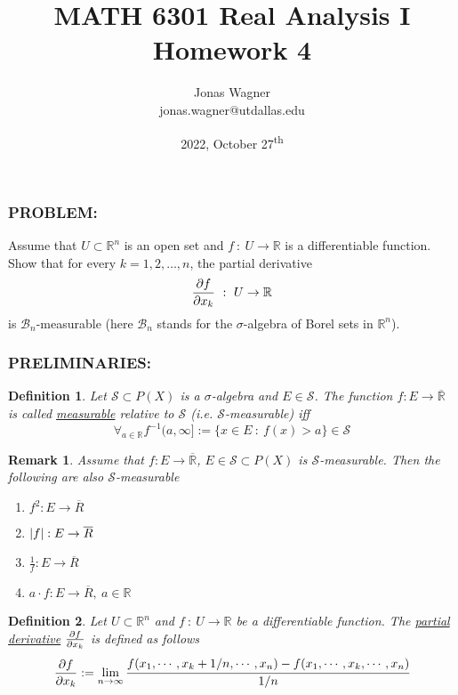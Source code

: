 \documentclass[]{article}
\title{MATH 6301 Real Analysis I \\ Homework 4}
\author{Jonas Wagner\\ jonas.wagner@utdallas.edu}
\date{2022, October 27\textsuperscript{th}}
\newcommand{\Problem}{\subsubsection*{\textbf{PROBLEM:}}}
\newcommand{\Preliminaries}{\subsubsection*{\textbf{PRELIMINARIES:}}}
\newcommand{\R}{\mathbb{R}}
\newcommand{\SigAlg}{\mathcal{S}}
\newcommand{\st}{\ : \ }
\newtheorem{definition}{Definition}
\newtheorem{remark}{Remark}
\begin{document}
\maketitle

\tableofcontents



\newpage
\section{}
\Problem
Assume that $U \subset \R^n$ is an open set and $f \st U \to \R$ is a differentiable function.
Show that for every $k = 1,2,\dots,n$, the partial derivative \[
    \pdv{f}{x_k} \st U \to \R
\] is $\mathcal{B}_n$-measurable (here $\mathcal{B}_n$ stands for the $\sigma$-algebra of Borel sets in $\R^n$).

\Preliminaries
\begin{definition}
    Let $\SigAlg \subset P(X)$ is a $\sigma$-algebra and $E \in \SigAlg$.
    The function $f : E \to \overline{\R}$ is called \emph{\underline{measurable}} relative to $\SigAlg$ (i.e. $\SigAlg$-measurable) iff \[
        \forall_{a \in \R} f^{-1}(a,\infty] := \{x \in E \st f(x) > a\} \in \SigAlg
    \] 
\end{definition}
\begin{remark}
    Assume that $f : E \to \overline{\R}$, $E \in \SigAlg \subset P(X)$ is $\SigAlg$-measurable.
    Then the following are also $\SigAlg$-measurable
    \begin{enumerate}
        \item $f^2 : E \to \overline{R}$
        \item $\abs{f} : E \to \overline{R}$
        \item $\frac{1}{f} : E \to \overline{R}$
        \item $a \cdot f : E \to \overline{R}, \ a \in \R$
    \end{enumerate}
\end{remark}
\begin{definition}
    Let $U \subset \R^n$ and $f \st U \to \R$ be a differentiable function.
    The \emph{\underline{partial derivative}} $\pdv{f}{x_k}$ is defined as follows \[
        \pdv{f}{x_k} := \lim_{n\to\infty} \cfrac{
            f \qty(
                x_1, 
                \cdots, x_k + 1/n, \cdots
                , x_n
            ) - f \qty(
                x_1, 
                \cdots, x_k, \cdots
                , x_n
            )}{1/n}
    \]
\end{definition}
\end{document}
